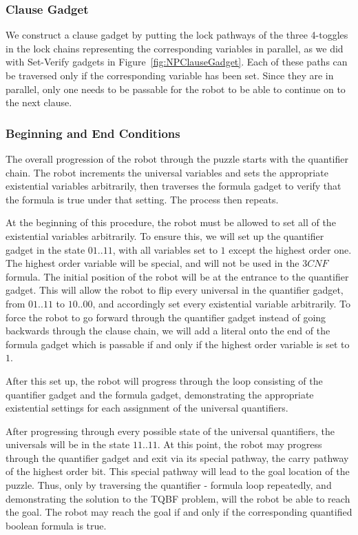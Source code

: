 \subsubsection{Clause Gadget}
We construct a clause gadget by putting the lock pathways of the three 4-toggles in the lock chains representing the corresponding variables in parallel, as we did with Set-Verify gadgets in Figure~\ref{fig:NPClauseGadget}. Each of these paths can be traversed only if the corresponding variable has been set. Since they are in parallel, only one needs to be passable for the robot to be able to continue on to the next clause.

\subsubsection{Beginning and End Conditions}
The overall progression of the robot through the puzzle starts with the quantifier chain.
The robot increments the universal variables and sets the appropriate existential variables arbitrarily, then traverses the formula gadget to verify that the formula is true under that setting. The process then repeats.

At the beginning of this procedure, the robot must be allowed to set all of the existential variables arbitrarily.
To ensure this, we will set up the quantifier gadget in the state $01 .. 11$, with all variables set to $1$
except the highest order one.  The highest order variable will be special, and will not be used in the $3CNF$
formula. The initial position of the robot will be at the entrance to the quantifier gadget. This will allow
the robot to flip every universal in the quantifier gadget, from $01 .. 11$ to $10 .. 00$, and accordingly
set every existential variable arbitrarily. To force the robot to go forward through the quantifier gadget
instead of going backwards through the clause chain, we will add a literal onto the end of the formula gadget
which is passable if and only if the highest order variable is set to $1$.

After this set up, the robot will progress through the loop consisting of the quantifier gadget and the
formula gadget, demonstrating the appropriate existential settings for each assignment of the universal
quantifiers.

After progressing through every possible state of the universal quantifiers, the universals will be in the
state $11 .. 11$. At this point, the robot may progress through the quantifier gadget and exit via its special
pathway,
the carry pathway of the highest order bit. This special pathway will lead to the goal location of the puzzle.
Thus, only by traversing the quantifier - formula loop repeatedly, and demonstrating the solution to the TQBF
problem,
will the robot be able to reach the goal. The robot may reach the goal if and only if the corresponding quantified
boolean formula is true.
